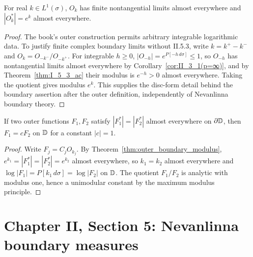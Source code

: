 \begin{theorem}
  \label{thm:outer_boundary_modulus}
  \leanok
  For real $k\in L^1(\sigma)$, $O_k$ has finite nontangential limits
  almost everywhere and $|O_k^*|=e^k$ almost everywhere.
  \begin{proof}
    \leanok
    The book's outer construction permits arbitrary integrable logarithmic
    data. To justify finite complex boundary limits without II.5.3, write
    $k=k^+-k^-$ and $O_k=O_{-k^-}/O_{-k^+}$. For integrable $h\ge0$,
    $|O_{-h}|=e^{P[-h\,d\sigma]}\le1$, so $O_{-h}$ has nontangential limits
    almost everywhere by Corollary~\ref{cor:II_3_1(p=∞)}, and by
    Theorem~\ref{thm:I_5_3_ac} their modulus is $e^{-h}>0$ almost everywhere.
    Taking the quotient gives modulus $e^k$.
    This supplies the disc-form detail behind the boundary assertion after
    the outer definition, independently of Nevanlinna boundary theory.
  \end{proof}
\end{theorem}

\begin{theorem}
  \label{thm:outer_uniqueness}
  \leanok
  \mainline
  If two outer functions $F_1,F_2$ satisfy $|F_1^*|=|F_2^*|$ almost
  everywhere on $\partial\mathbb{D}$, then $F_1=cF_2$ on $\mathbb{D}$ for a constant $|c|=1$.
  \begin{proof}
    \leanok
    Write $F_j=C_jO_{k_j}$. By Theorem~\ref{thm:outer_boundary_modulus},
    $e^{k_1}=|F_1^*|=|F_2^*|=e^{k_2}$ almost everywhere, so $k_1=k_2$
    almost everywhere and $\log|F_1|=P[k_1\,d\sigma]=\log|F_2|$ on $\mathbb{D}$. The
    quotient $F_1/F_2$ is analytic with modulus one, hence a unimodular
    constant by the maximum modulus principle.
  \end{proof}
\end{theorem}

\section{Chapter II, Section 5: Nevanlinna boundary measures}

